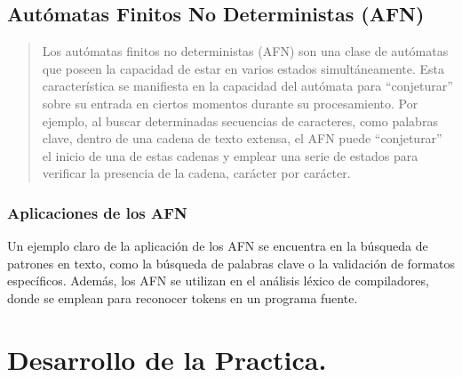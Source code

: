 \documentclass{article}
\begin{document}
    \subsection{Autómatas Finitos No Deterministas (AFN)}

    \begin{quote}
        Los autómatas finitos no deterministas (AFN) son una clase de autómatas que poseen la capacidad de estar en varios estados
        simultáneamente. Esta característica se manifiesta en la capacidad del autómata para ``conjeturar'' sobre su entrada en ciertos
        momentos durante su procesamiento. Por ejemplo, al buscar determinadas secuencias de caracteres, como palabras clave, dentro de
        una cadena de texto extensa, el AFN puede ``conjeturar'' el inicio de una de estas cadenas y emplear una serie de estados para
        verificar la presencia de la cadena, carácter por carácter.\cite{hopcroft2007introduccion}
    \end{quote}

        \subsubsection{Aplicaciones de los AFN}

        Un ejemplo claro de la aplicación de los AFN se encuentra en la búsqueda de patrones en texto, como la búsqueda de palabras clave
        o la validación de formatos específicos. Además, los AFN se utilizan en el análisis léxico de compiladores, donde se emplean para
        reconocer tokens en un programa fuente.

\section[Desarrollo]{Desarrollo de la Practica.}
\end{document}

